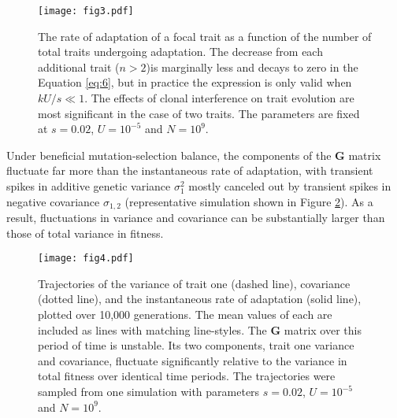 \documentclass[9pt,twocolumn,twoside]{gsajnl}
\newcommand{\G}{\textbf{G }}
\begin{document}
\begin{figure}[!ht]
\centering
\texttt{[image: fig3.pdf]}
\caption{The rate of adaptation of a focal trait as a function of the number of total traits undergoing adaptation. The decrease from each additional trait ($n>2$)is marginally less and decays to zero in the Equation \eqref{eq:6}, but in practice the expression is only valid when $kU/s \ll 1$. The effects of clonal interference on trait evolution are most significant in the case of two traits. The parameters are fixed at $s=0.02$, $U=10^{-5}$ and $N=10^9$.}
\label{fig:3}
\end{figure}

Under beneficial mutation-selection balance, the components of the \G matrix fluctuate far more than the instantaneous rate of adaptation, with transient spikes in additive genetic variance $\sigma_1^2$ mostly canceled out by transient spikes in negative covariance $\sigma_{1,2}$ (representative simulation shown in Figure \ref{fig:4}). As a result, fluctuations in variance and covariance can be substantially larger than those of total variance in fitness.\par

\begin{figure}[!ht]
\texttt{[image: fig4.pdf]}
% 
% 
\caption{Trajectories of the variance of trait one (dashed line), covariance (dotted line), and the instantaneous rate of adaptation (solid line), plotted over 10,000 generations. The mean values of each are included as lines with matching line-styles. The \G matrix over this period of time is unstable. Its two components, trait one variance and covariance, fluctuate significantly relative to the variance in total fitness over identical time periods. The trajectories were sampled from one simulation with parameters $s=0.02$, $U=10^{-5}$ and $N=10^9$.}\label{fig:4}
% 
% 
% 
%
\end{figure}
\end{document}
